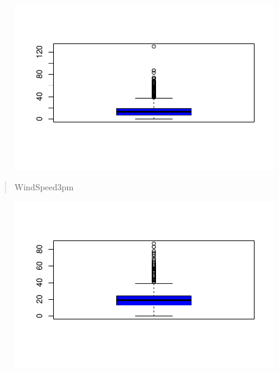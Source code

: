 \documentclass[
  letterpaper,
  DIV=11,
  numbers=noendperiod]{scrartcl}
\newenvironment{Shaded}{\begin{snugshade}}{\end{snugshade}}
\newcommand{\AttributeTok}[1]{\textcolor[rgb]{0.40,0.45,0.13}{#1}}
\newcommand{\FunctionTok}[1]{\textcolor[rgb]{0.28,0.35,0.67}{#1}}
\newcommand{\NormalTok}[1]{\textcolor[rgb]{0.00,0.23,0.31}{#1}}
\newcommand{\SpecialCharTok}[1]{\textcolor[rgb]{0.37,0.37,0.37}{#1}}
\newcommand{\StringTok}[1]{\textcolor[rgb]{0.13,0.47,0.30}{#1}}
\begin{document}
\begin{figure}[H]

{\centering \includegraphics{RainAus_EDA_files/figure-pdf/unnamed-chunk-16-1.pdf}

}

\end{figure}

\begin{quote}
WindSpeed3pm
\end{quote}

\begin{Shaded}
\end{Shaded}

\begin{figure}[H]

{\centering \includegraphics{RainAus_EDA_files/figure-pdf/unnamed-chunk-17-1.pdf}

}

\end{figure}
\end{document}
